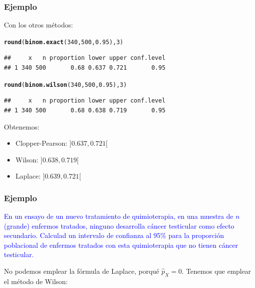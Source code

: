 \documentclass[12pt,t]{beamer}\usepackage[]{graphicx}\usepackage[]{color}
\makeatletter
\newcommand{\hlnum}[1]{\textcolor[rgb]{0.686,0.059,0.569}{#1}}%
\newcommand{\hlstd}[1]{\textcolor[rgb]{0.345,0.345,0.345}{#1}}%
\newcommand{\hlkwd}[1]{\textcolor[rgb]{0.737,0.353,0.396}{\textbf{#1}}}%
\newenvironment{kframe}{%
 \def\at@end@of@kframe{}%
 \ifinner\ifhmode%
  \def\at@end@of@kframe{\end{minipage}}%
  \begin{minipage}{\columnwidth}%
 \fi\fi%
 \def\FrameCommand##1{\hskip\@totalleftmargin \hskip-\fboxsep
 \colorbox{shadecolor}{##1}\hskip-\fboxsep
     \hskip-\linewidth \hskip-\@totalleftmargin \hskip\columnwidth}%
 \MakeFramed {\advance\hsize-\width
   \@totalleftmargin\z@ \linewidth\hsize
   \@setminipage}}%
 {\par\unskip\endMakeFramed%
 \at@end@of@kframe}
\newenvironment{knitrout}{}{} %
\newcommand{\blue}[1]{\textcolor{blue}{#1}}
\theoremstyle{plain}
\theoremstyle{definition}
\makeatother
\begin{document}
\begin{frame}[fragile]
\frametitle{Ejemplo}

Con los otros métodos:


\begin{knitrout}
\color{fgcolor}\begin{kframe}
\begin{alltt}
\hlkwd{round}\hlstd{(}\hlkwd{binom.exact}\hlstd{(}\hlnum{340}\hlstd{,}\hlnum{500}\hlstd{,}\hlnum{0.95}\hlstd{),}\hlnum{3}\hlstd{)}
\end{alltt}
\begin{verbatim}
##     x   n proportion lower upper conf.level
## 1 340 500       0.68 0.637 0.721       0.95
\end{verbatim}
\begin{alltt}
\hlkwd{round}\hlstd{(}\hlkwd{binom.wilson}\hlstd{(}\hlnum{340}\hlstd{,}\hlnum{500}\hlstd{,}\hlnum{0.95}\hlstd{),}\hlnum{3}\hlstd{)}
\end{alltt}
\begin{verbatim}
##     x   n proportion lower upper conf.level
## 1 340 500       0.68 0.638 0.719       0.95
\end{verbatim}
\end{kframe}
\end{knitrout}


Obtenemos:
\medskip

\begin{itemize}
\item Clopper-Pearson: $]0.637,0.721[$
\medskip

\item Wilson: $]0.638, 0.719[$
\medskip

\item Laplace: $]0.639,0.721[$
\end{itemize}

\end{frame}

\begin{frame}
\frametitle{Ejemplo}

\blue{En un ensayo de un nuevo  tratamiento de quimioterapia, en una muestra de $n$ (grande) enfermos tratados, ninguno desarrolla cáncer testicular
como  efecto secundario. Calculad un intervalo de confianza  al 95\%  para la proporción poblacional  de enfermos tratados con esta
quimioterapia que no tienen cáncer testicular.}
\bigskip

No podemos emplear la fórmula de Laplace, porqué $\widehat{p}_X=0$. Tenemos que emplear el método de Wilson:


\end{frame}
\end{document}

